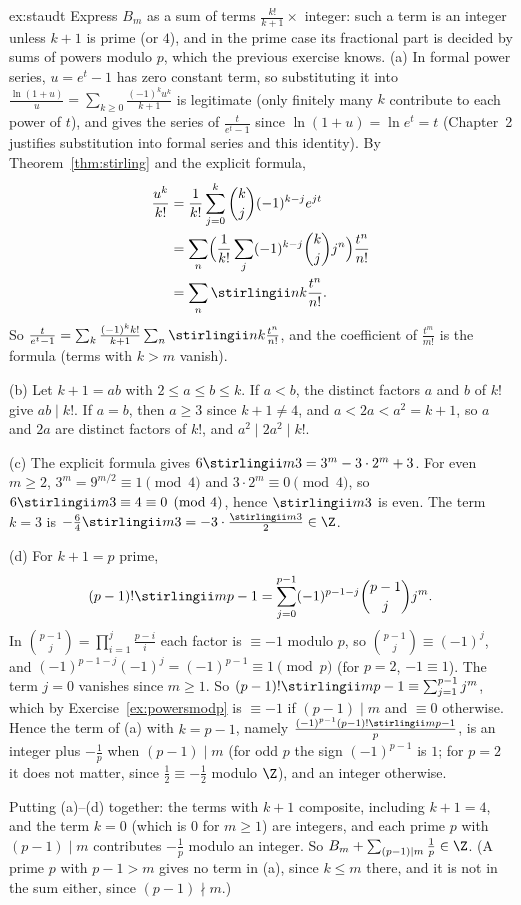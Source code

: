 \begin{solution}{ex:staudt}
\idea Express $B_m$ as a sum of terms $\frac{k!}{k+1}\times$ integer: such a term is an integer unless $k+1$ is prime (or
$4$), and in the prime case its fractional part is decided by sums of powers modulo $p$, which the previous exercise
knows.
\writeup (a) In formal power series, $u=e^t-1$ has zero constant term, so substituting it into
$\frac{\ln(1+u)}u=\sum_{k\ge0}\frac{(-1)^ku^k}{k+1}$ is legitimate (only finitely many $k$ contribute to each power of $t$), and
gives the series of $\frac t{e^t-1}$ since $\ln(1+u)=\ln e^t=t$ (Chapter~2 justifies substitution into formal series
and this identity). By Theorem~\ref{thm:stirling} and the explicit formula,
\[
\begin{aligned}\frac{u^k}{k!}&=\frac1{k!}\sum_{j=0}^k\binom kj(-1)^{k-j}e^{jt}\\&=\sum_n\Bigl(\frac1{k!}\sum_j(-1)^{k-j}\binom kjj^n\Bigr)\frac{t^n}{n!}\\&=\sum_n\stirlingii nk\frac{t^n}{n!}.\end{aligned}
\]
So $\frac t{e^t-1}=\sum_k\frac{(-1)^kk!}{k+1}\sum_n\stirlingii nk\frac{t^n}{n!}$, and the coefficient of $\frac{t^m}{m!}$ is the
formula (terms with $k>m$ vanish).

(b) Let $k+1=ab$ with $2\le a\le b\le k$. If $a<b$, the distinct factors $a$ and $b$ of $k!$ give $ab\mid k!$. If $a=b$,
then $a\ge3$ since $k+1\ne4$, and $a<2a<a^2=k+1$, so $a$ and $2a$ are distinct factors of $k!$, and $a^2\mid2a^2\mid k!$.

(c) The explicit formula gives $6\stirlingii m3=3^m-3\cdot2^m+3$. For even $m\ge2$, $3^m=9^{m/2}\equiv1\pmod 4$ and
$3\cdot2^m\equiv0\pmod 4$, so $6\stirlingii m3\equiv4\equiv0\pmod 4$, hence $\stirlingii m3$ is even. The term $k=3$ is
$-\frac64\stirlingii m3=-3\cdot\frac{\stirlingii m3}2\in\Z$.

(d) For $k+1=p$ prime,
\[
(p-1)!\stirlingii m{p-1}=\sum_{j=0}^{p-1}(-1)^{p-1-j}\binom{p-1}jj^m.
\]
In $\binom{p-1}j=\prod_{i=1}^j\frac{p-i}i$
each factor is $\equiv-1$ modulo $p$, so $\binom{p-1}j\equiv(-1)^j$, and $(-1)^{p-1-j}(-1)^j=(-1)^{p-1}\equiv1\pmod p$
(for $p=2$, $-1\equiv1$). The term $j=0$ vanishes since $m\ge1$. So $(p-1)!\stirlingii m{p-1}\equiv\sum_{j=1}^{p-1}j^m$,
which by Exercise~\ref{ex:powersmodp} is $\equiv-1$ if $(p-1)\mid m$ and $\equiv0$ otherwise. Hence the term of (a)
with $k=p-1$, namely $\frac{(-1)^{p-1}(p-1)!\stirlingii m{p-1}}p$, is an integer plus $-\frac1p$ when $(p-1)\mid m$
(for odd $p$ the sign $(-1)^{p-1}$ is $1$; for $p=2$ it does not matter, since $\frac12\equiv-\frac12$ modulo $\Z$), and an
integer otherwise.

Putting (a)--(d) together: the terms with $k+1$ composite, including $k+1=4$, and the term $k=0$ (which is $0$ for
$m\ge1$) are integers, and each prime $p$ with $(p-1)\mid m$ contributes $-\frac1p$ modulo an integer. So
$B_m+\sum_{(p-1)\mid m}\frac1p\in\Z$. (A prime $p$ with $p-1>m$ gives no term in (a), since $k\le m$ there, and it is
not in the sum either, since $(p-1)\nmid m$.)
\end{solution}

